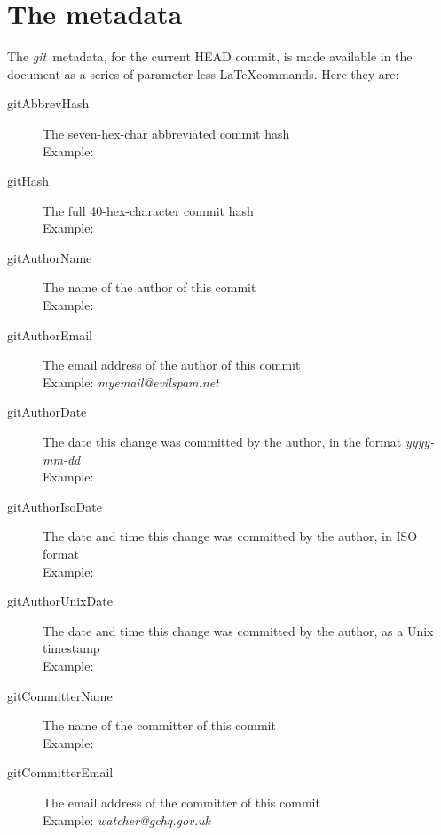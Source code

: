 \documentclass[a4paper,12pt,twoside,openany]{memoir}
\makeatletter
\newcommand{\sfit}[1]{\textit{#1}}
\newcommand{\git}{\sfit{git}}
\newcommand*{\emailat}{@}
\makeatother
\begin{document}
\section{The metadata}
The \git\ metadata, for the current HEAD commit,
is made available in the document
as a series of parameter-less \LaTeX commands.
Here they are:

\begin{description}

\item[gitAbbrevHash]
    The seven-hex-char abbreviated commit hash\\
    Example: \textit{\gitAbbrevHash}

\item[gitHash]
    The full 40-hex-character commit hash\\
    Example: \textit{\gitHash}

\item[gitAuthorName]
    The name of the author of this commit\\
    Example: \textit{\gitAuthorName}

\item[gitAuthorEmail]
    The email address of the author of this commit\\
    Example: \textit{myemail\emailat evilspam.net}

\item[gitAuthorDate]
    The date this change was committed by the author,
    in the format \textit{yyyy-mm-dd}\\
    Example: \textit{\gitAuthorDate}

\item[gitAuthorIsoDate]
    The date and time this change was committed by the author,
    in ISO format\\
    Example: \textit{\gitAuthorIsoDate}

\item[gitAuthorUnixDate]
    The date and time this change was committed by the author,
    as a Unix timestamp\\
    Example: \textit{\gitAuthorUnixDate}

\item[gitCommitterName]
    The name of the committer of this commit\\
    Example: \textit{\gitCommitterName}

\item[gitCommitterEmail]
    The email address of the committer of this commit\\
    Example: \textit{watcher\emailat gchq.gov.uk}


\end{description}
\end{document}
